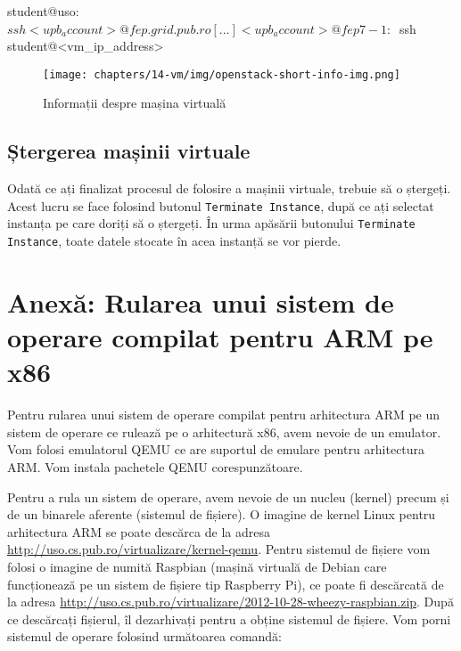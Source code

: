 \begin{screen}[caption={Accesarea mașinii virtuale prin intermediul fep.grid.pub.ro},label={lst:vm:access-vm}]
student@uso:~$ ssh <upb_account>@fep.grid.pub.ro
[...]
<upb_account>@fep7-1:~$ ssh student@<vm_ip_address>
\end{screen}

\begin{figure}[!htbp]
	\centering
	\texttt{[image: chapters/14-vm/img/openstack-short-info-img.png]}
	\caption{Informații despre mașina virtuală}
	\label{fig:vm:openstack-info}
\end{figure}

\subsection{Ștergerea mașinii virtuale}
\label{sec:vm:openstack:vm-delete}

Odată ce ați finalizat procesul de folosire a mașinii virtuale, trebuie să o
ștergeți. Acest lucru se face folosind butonul \texttt{Terminate Instance},
după ce ați selectat instanța pe care doriți să o ștergeți. În urma apăsării
butonului \texttt{Terminate Instance}, toate datele stocate în acea instanță se vor
pierde.

\section{Anexă: Rularea unui sistem de operare compilat pentru ARM pe x86}
\label{sec:vm:arm}

Pentru rularea unui sistem de operare compilat pentru arhitectura ARM pe un
sistem de operare ce rulează pe o arhitectură x86, avem nevoie de un emulator.
Vom folosi emulatorul QEMU ce are suportul de emulare pentru arhitectura ARM.
Vom instala pachetele QEMU corespunzătoare.


Pentru a rula un sistem de operare, avem nevoie de un nucleu (kernel) precum și
de un binarele aferente (sistemul de fișiere). O imagine de kernel Linux pentru
arhitectura ARM se poate descărca de la adresa \url{http://uso.cs.pub.ro/virtualizare/kernel-qemu}. Pentru sistemul de fișiere vom
folosi o imagine de numită Raspbian (mașină virtuală de Debian care funcționează pe un
sistem de fișiere tip Raspberry Pi), ce poate fi descărcată de la adresa
\url{http://uso.cs.pub.ro/virtualizare/2012-10-28-wheezy-raspbian.zip}. După ce
descărcați fișierul, îl dezarhivați pentru a obține sistemul de fișiere. Vom
porni sistemul de operare folosind următoarea comandă:

